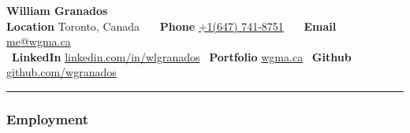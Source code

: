 \documentclass[10pt,letterpaper]{article}
\begin{document}
		\begin{center}
			{\LARGE \textbf{William Granados}}
			\ \vspace{0.2em}
			\ \\ \textbf{Location} Toronto, Canada\ \ \textbullet
			\ \textbf{Phone} \href{tel:16477418751}{+1(647) 741-8751}\ \ \textbullet
			\ \textbf{Email}  \href{mailto:me@wgma.ca}{me@wgma.ca}
			\\ \ \textbf{LinkedIn} \href{https://linkedin.com/in/wlgranados}{linkedin.com/in/wlgranados} \textbullet
			\ \textbf{Portfolio} \href{https://wgma.ca}{wgma.ca} \textbullet
			\ \textbf{Github} \href{https://github.com/wgranados}{github.com/wgranados}
			\
		\end{center}

		\vspace{-0.3em}
		\hrule
		\vspace{-0.4em}
		\bigskip

		\subsubsection*{Employment}
\end{document}
